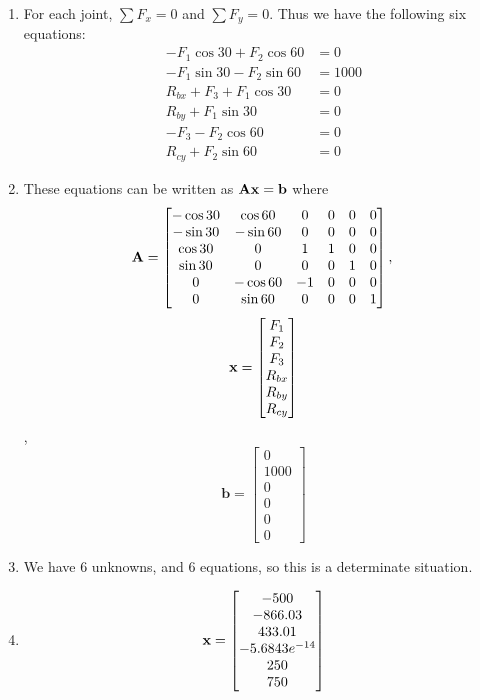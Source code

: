 \begin{sol}
\begin{enumerate}
	 \item For each joint, $\sum F_x = 0$ and $\sum F_y = 0$. Thus we have the  following six equations:
    \begin{align*}
        -F_1\cos30 + F_2\cos60 &= 0 \\
        -F_1\sin30 - F_2\sin60 &= 1000 \\
        R_{bx} + F_3 + F_1\cos30 &= 0 \\
        R_{by} + F_1\sin30 &= 0 \\
        -F_3 - F_2\cos60 &= 0 \\
        R_{cy} + F_2\sin60 &= 0
    \end{align*}
    
    \item These equations can be written as $\mathbf{A}\mathbf{x} = \mathbf{b}$ where 
    $$\mathbf{A} = \begin{bmatrix}
        -\cos30 & \cos60 & 0 & 0 & 0 & 0 \\
        -\sin30 & -\sin60 & 0 & 0 & 0 & 0 \\
        \cos30 & 0 & 1 & 1 & 0 & 0 \\
        \sin30 & 0 & 0 &  0 & 1 & 0 \\
        0 & -\cos60 & -1 & 0 & 0 & 0 \\
        0 & \sin60 & 0 & 0 & 0 & 1
    \end{bmatrix}, \;$$
    $$\mathbf{x} = \begin{bmatrix} F_1 \\ F_2 \\ F_3 \\ R_{bx} \\ R_{by} \\ R_{cy} \end{bmatrix}$$, \;
    $$\mathbf{b} = \begin{bmatrix} 0 \\ 1000 \\ 0 \\ 0 \\ 0 \\ 0 \end{bmatrix}$$
    
    \item We have 6 unknowns, and 6 equations, so this is a determinate situation.
    
    \item  
        $$\mathbf{x} = \begin{bmatrix}
            -500 \\
            -866.03 \\
            433.01 \\
            -5.6843e^{-14} \\
            250 \\
            750
        \end{bmatrix}$$
    

\end{enumerate}
\end{sol}
